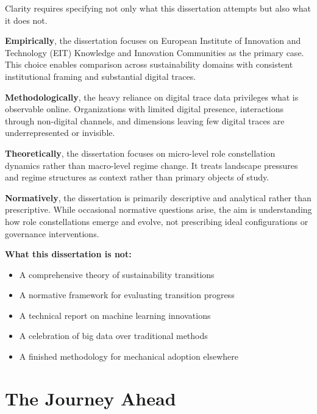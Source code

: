 \documentclass[../main.tex]{subfiles}
\begin{document}
Clarity requires specifying not only what this dissertation attempts but also what it does not.

\textbf{Empirically}, the dissertation focuses on European Institute of Innovation and Technology (EIT) Knowledge and Innovation Communities as the primary case. This choice enables comparison across sustainability domains with consistent institutional framing and substantial digital traces.

\textbf{Methodologically}, the heavy reliance on digital trace data privileges what is observable online. Organizations with limited digital presence, interactions through non-digital channels, and dimensions leaving few digital traces are underrepresented or invisible.

\textbf{Theoretically}, the dissertation focuses on micro-level role constellation dynamics rather than macro-level regime change. It treats landscape pressures and regime structures as context rather than primary objects of study.

\textbf{Normatively}, the dissertation is primarily descriptive and analytical rather than prescriptive. While occasional normative questions arise, the aim is understanding how role constellations emerge and evolve, not prescribing ideal configurations or governance interventions.

\begin{importantbox}
\textbf{What this dissertation is not:}
\begin{itemize}[leftmargin=*, itemsep=0.2em]
\item A comprehensive theory of sustainability transitions
\item A normative framework for evaluating transition progress
\item A technical report on machine learning innovations
\item A celebration of big data over traditional methods
\item A finished methodology for mechanical adoption elsewhere
\end{itemize}
\end{importantbox}


\section{The Journey Ahead}
\label{sec:intro:journey}
\end{document}
